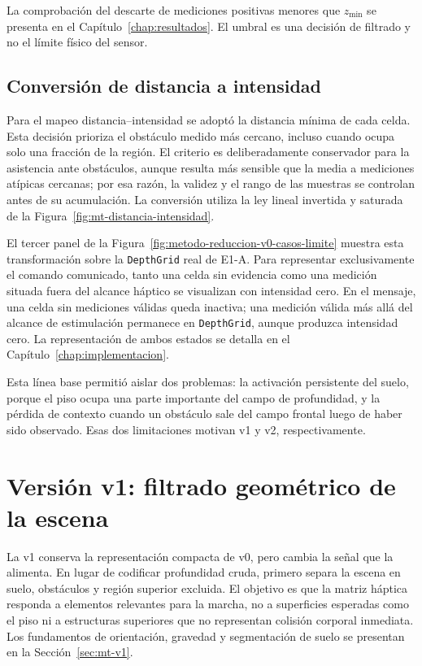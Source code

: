 La comprobación del descarte de mediciones positivas menores que $z_{\min}$ se presenta en
el Capítulo~\ref{chap:resultados}. El umbral es una decisión de filtrado y no el límite físico del sensor.

\subsection{Conversión de distancia a intensidad}
\label{sec:metodo-v0-intensidad}

Para el mapeo distancia--intensidad se adoptó la distancia mínima de cada celda. Esta decisión
prioriza el obstáculo medido más cercano, incluso cuando ocupa solo una fracción de la región. El
criterio es deliberadamente conservador para la asistencia ante obstáculos, aunque resulta más
sensible que la media a mediciones atípicas cercanas; por esa razón, la validez y el rango de las
muestras se controlan antes de su acumulación. La conversión utiliza la ley lineal invertida y
saturada de la Figura~\ref{fig:mt-distancia-intensidad}.

El tercer panel de la Figura~\ref{fig:metodo-reduccion-v0-casos-limite} muestra esta transformación
sobre la \texttt{DepthGrid} real de E1-A. Para representar exclusivamente el comando comunicado,
tanto una celda sin evidencia como una medición situada fuera del alcance háptico se visualizan con
intensidad cero. En el mensaje, una celda sin mediciones válidas queda inactiva; una medición
válida más allá del alcance de estimulación permanece en \texttt{DepthGrid}, aunque produzca
intensidad cero. La representación de ambos estados se detalla en el
Capítulo~\ref{chap:implementacion}.

Esta línea base permitió aislar dos problemas: la activación persistente del suelo, porque el piso
ocupa una parte importante del campo de profundidad, y la pérdida de contexto cuando un obstáculo
sale del campo frontal luego de haber sido observado. Esas dos limitaciones motivan v1 y v2,
respectivamente.

\clearpage
\section{Versión v1: filtrado geométrico de la escena}
\label{sec:metodo-v1}

La v1 conserva la representación compacta de v0, pero cambia la señal que la alimenta. En lugar de
codificar profundidad cruda, primero separa la escena en suelo, obstáculos y región superior
excluida. El objetivo es
que la matriz háptica responda a elementos relevantes para la marcha, no a superficies esperadas
como el piso ni a estructuras superiores que no representan colisión corporal inmediata. Los
fundamentos de orientación, gravedad y segmentación de suelo se presentan en la
Sección~\ref{sec:mt-v1}.

